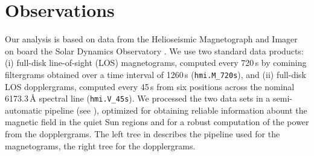 \documentclass{aa}
\begin{document}

%
%
%
%
%
%
%


\section{Observations}\label{pipeline}

Our analysis is based on data from the Helioseismic Magnetograph and Imager \cite[HMI,][]{2012SoPh..275..207S,2012SoPh..275..229S} on board the Solar Dynamics Observatory \cite[SDO,][]{2012SoPh..275....3P}. We use two standard data products: (i) full-disk line-of-sight (LOS) magnetograms, computed every 720\,s by comining filtergrams obtained over a time interval of 1260\,s (\texttt{hmi.M\_720s}), and (ii) full-disk LOS dopplergrams, computed every 45\,s from six positions across the nominal 6173.3\,\AA{} spectral line (\texttt{hmi.V\_45s}). We processed the two data sets in a semi-automatic pipeline (see ), optimized for obtaining reliable information abount the magnetic field in the quiet Sun regions and for a robust computation of the \fff power from the dopplergrams. The left tree in  describes the pipeline used for the magnetograms, the right tree for the dopplergrams.
\end{document}
